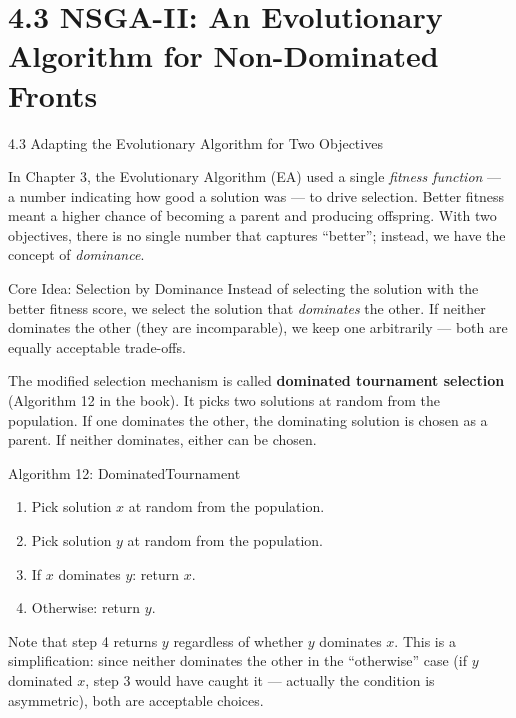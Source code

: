 \documentclass[aspectratio=169,10pt]{beamer}
\begin{document}
\section{4.3 NSGA-II: An Evolutionary Algorithm for Non-Dominated Fronts}

\begin{frame}[allowframebreaks]{4.3 Adapting the Evolutionary Algorithm for Two Objectives}

  In Chapter 3, the Evolutionary Algorithm (EA) used a single \emph{fitness
  function} --- a number indicating how good a solution was --- to drive
  selection.  Better fitness meant a higher chance of becoming a parent and
  producing offspring.  With two objectives, there is no single number that
  captures ``better''; instead, we have the concept of \emph{dominance}.

  \begin{block}{Core Idea: Selection by Dominance}
    Instead of selecting the solution with the better fitness score, we select the
    solution that \emph{dominates} the other.  If neither dominates the other
    (they are incomparable), we keep one arbitrarily --- both are equally
    acceptable trade-offs.
  \end{block}

  The modified selection mechanism is called \textbf{dominated tournament
  selection} (Algorithm 12 in the book).  It picks two solutions at random from
  the population.  If one dominates the other, the dominating solution is chosen
  as a parent.  If neither dominates, either can be chosen.

  \framebreak

  \begin{block}{Algorithm 12: DominatedTournament}
    \begin{enumerate}
      \item Pick solution $x$ at random from the population.
      \item Pick solution $y$ at random from the population.
      \item If $x$ dominates $y$: return $x$.
      \item Otherwise: return $y$.
    \end{enumerate}
  \end{block}

  Note that step 4 returns $y$ regardless of whether $y$ dominates $x$.  This is
  a simplification: since neither dominates the other in the ``otherwise'' case
  (if $y$ dominated $x$, step 3 would have caught it --- actually the condition is
  asymmetric), both are acceptable choices.


\end{frame}
\end{document}
